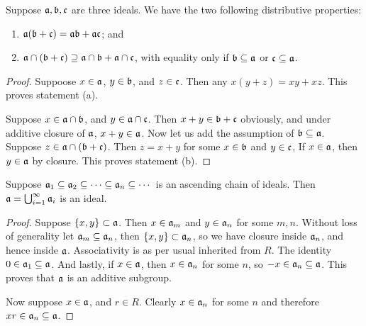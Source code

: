 \begin{proposition}\label{prop:ideal-distributive}
    Suppose \(\mathfrak{a,b,c}\) are three ideals.
    We have the two following distributive properties:
    \begin{enumerate}[label={(\alph*)}, itemsep=0mm]
        \item \(\mathfrak{a(b+c)} = \mathfrak{ab} + \mathfrak{ac}\); and
        \item \(\mathfrak{a \cap (b+c)} \supseteq \mathfrak{a \cap b} + \mathfrak{a \cap c}\),
            with equality only if \(\mathfrak{b} \subseteq \mathfrak{a}\) or \(\mathfrak{c} \subseteq \mathfrak{a}\).
    \end{enumerate}
\end{proposition}
\begin{proof}
    Suppoose \(x \in \mathfrak{a}\), \(y \in \mathfrak{b}\), and \(z \in \mathfrak{c}\).
    Then any \(x(y+z) = xy + xz\).
    This proves statement (a).

    Suppose \(x \in \mathfrak{a \cap b}\), and \(y \in \mathfrak{a \cap c}\).
    Then \(x+y \in \mathfrak{b+c}\) obviously,
    and under additive closure of \(\mathfrak{a}\), \(x+y \in \mathfrak{a}\).
    Now let us add the assumption of \(\mathfrak{b} \subseteq \mathfrak{a}\).
    Suppose \(z \in \mathfrak{a \cap (b+c)}\).
    Then \(z = x+y\) for some \(x \in \mathfrak{b}\) and \(y \in \mathfrak{c}\),
    If \(x \in \mathfrak{a}\), then \(y \in \mathfrak{a}\) by closure.
    This proves statement (b).
\end{proof}
\begin{proposition}\label{prop:nested-ideals}
    Suppose \(\mathfrak{a}_1 \subseteq \mathfrak{a}_2 \subseteq \cdots \subseteq
    \mathfrak{a}_n \subseteq \cdots\) is an ascending chain of ideals.
    Then \(\mathfrak{a} = \bigcup_{i=1}^\infty \mathfrak{a}_i\) is an ideal.
\end{proposition}
\begin{proof}
    Suppose \(\{x,y\} \subset \mathfrak{a}\).
    Then \(x \in \mathfrak{a}_m\) and \(y \in \mathfrak{a}_n\) for some \(m,n\).
    Without loss of generality let \(\mathfrak{a}_m \subseteq \mathfrak{a}_n\),
    then \(\{x,y\} \subset \mathfrak{a}_n\),
    so we have closure inside \(\mathfrak{a}_n\), and hence inside \(\mathfrak{a}\).
    Associativity is as per usual inherited from \(R\).
    The identity \(0 \in \mathfrak{a}_1 \subseteq \mathfrak{a}\).
    And lastly, if \(x \in \mathfrak{a}\), then \(x \in \mathfrak{a}_n\) for some \(n\),
    so \(-x \in \mathfrak{a}_n \subseteq \mathfrak{a}\).
    This proves that \(\mathfrak{a}\) is an additive subgroup.
    
    Now suppose \(x \in \mathfrak{a}\), and \(r \in R\).
    Clearly \(x \in \mathfrak{a}_n\) for some \(n\)
    and therefore \(xr \in \mathfrak{a}_n \subseteq \mathfrak{a}\).
\end{proof}


